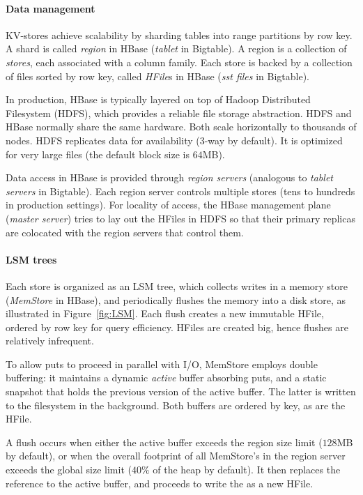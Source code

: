 \paragraph{Data management}
KV-stores achieve scalability by sharding tables into range partitions by row key. 
A shard is called {\em region\/} in HBase (\emph{tablet} in Bigtable). 
A region is a collection of \emph{stores}, each associated with a column family. 
Each store is backed by a collection of files sorted by row key, called \emph{HFile}s in HBase 
(\emph{sst files} in Bigtable). 

In production, HBase is typically layered on top of Hadoop Distributed Filesystem (HDFS), 
which provides a reliable file storage abstraction. HDFS and HBase normally share the same hardware. 
Both scale horizontally to thousands of nodes. HDFS replicates data for availability (3-way by default). 
It is optimized for very large files (the default block size is $64$MB).

Data access in HBase is provided through {\em region servers} (analogous to {\em tablet servers}
in Bigtable). Each region server controls multiple stores (tens to hundreds in production settings). 
For locality of access, the HBase management plane (\emph{master server}) tries to lay out the 
HFiles in HDFS so that their primary replicas are colocated with the region servers that control them. 

\paragraph{LSM trees}
Each store is organized as an LSM tree, which collects writes in a memory store 
(\emph{MemStore} in HBase), and periodically flushes the memory into a disk store, as illustrated in 
Figure~\ref{fig:LSM}. Each flush creates a new immutable HFile, ordered by row key for query efficiency. 
HFiles are created big, hence flushes are relatively infrequent. 

To allow puts to proceed in parallel with I/O, MemStore employs double buffering:
it maintains a dynamic \emph{active} buffer absorbing puts, and a static snapshot
that holds the previous version of the active buffer. The latter is written to the 
filesystem in the background. Both buffers are ordered by key, as are the HFile.  

A flush occurs  when either the active buffer 
exceeds the region size limit ($128$MB by default), or when the overall footprint of all MemStore's
in the region server exceeds the global size limit ($40\%$ of the heap by default). 
It then replaces the reference to the active buffer, and proceeds to write the 
as a new HFile. 

